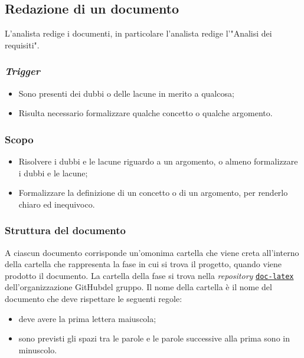 \subsection{Redazione di un documento}
\label{redazione-documento}

L'analista redige i documenti, in particolare l'analista redige l'"Analisi dei
requisiti".

\subsubsection{\textit{Trigger}}
\begin{itemize}
	\item Sono presenti dei dubbi o delle lacune in merito a qualcosa;

	\item Risulta necessario formalizzare qualche concetto o qualche argomento.
\end{itemize}

\subsubsection{Scopo}
\begin{itemize}
	\item Risolvere i dubbi e le lacune riguardo a un argomento, o almeno
	      formalizzare i dubbi e le lacune;

	\item Formalizzare la definizione di un concetto o di un argomento, per
	      renderlo chiaro ed inequivoco.
\end{itemize}

\subsubsection{Struttura del documento}

A ciascun documento corrisponde un'omonima cartella che viene creta all'interno
della cartella che rappresenta la fase in cui si trova il progetto, quando viene
prodotto il documento. La cartella della fase si trova nella \textit{repository\g}
\href{https://GitHub\g.com/Project-SWEnergy/doc-latex}{\texttt{doc-latex}}
dell'organizzazione GitHub\g del gruppo.
Il nome della cartella è il nome del documento che deve rispettare le seguenti
regole:
\begin{itemize}
	\item deve avere la prima lettera maiuscola;
	\item sono previsti gli spazi tra le parole e le parole successive alla
	      prima sono in minuscolo.
\end{itemize}

